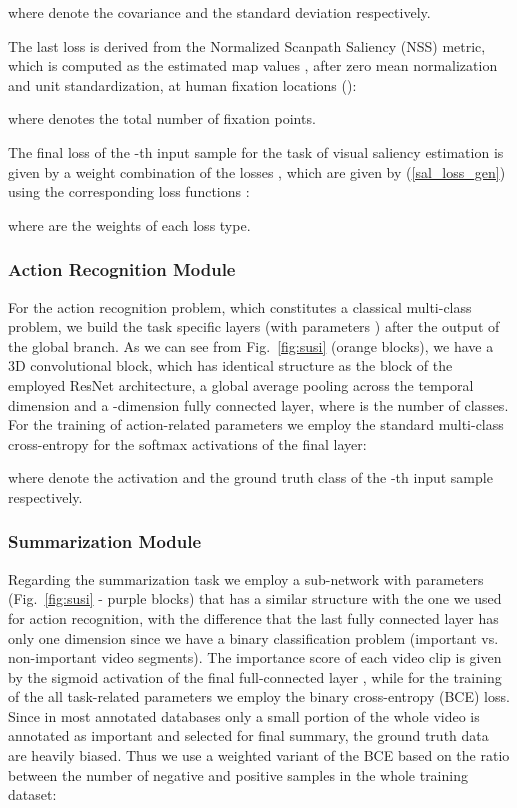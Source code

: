 \documentclass[10pt,twocolumn,letterpaper]{article}
\begin{document}
where  denote the covariance and the standard deviation respectively. 

The last loss is derived from the Normalized Scanpath Saliency (NSS) metric, which is computed
as the estimated map values , after zero mean normalization and unit standardization, at human fixation locations ():

where  denotes the total number of fixation points. 

The final loss of the -th input sample for the task of visual saliency estimation is given by a weight combination of the losses , which are given by (\ref{sal_loss_gen}) using the corresponding loss functions :
  
where  are the weights of each loss type.

\subsubsection{Action Recognition Module}

For the action recognition problem, which constitutes a classical multi-class problem, we build the task specific layers (with parameters ) after the output  of the global branch. As we can see from Fig.~\ref{fig:susi} (orange blocks), we have a 3D convolutional block, which has identical structure as the  block of the employed ResNet architecture, a global average pooling across the temporal dimension and a -dimension fully connected layer, where  is the number of classes. For the training of action-related parameters  we employ the standard multi-class cross-entropy for the softmax activations  of the final layer:

where  denote the activation and the ground truth class of the -th input sample respectively.

\subsubsection{Summarization Module}

Regarding the summarization task we employ a sub-network with parameters  (Fig.~\ref{fig:susi} - purple blocks) that has a similar structure with the one we used for action recognition, with the difference that the last fully connected layer has only one dimension since we have a binary classification problem (important vs. non-important video segments). The importance score of each video clip is given by the sigmoid activation of the final full-connected layer , while for the training of the all task-related parameters  we employ the binary cross-entropy (BCE) loss. Since in most annotated databases only a small portion of the whole video is annotated as important and selected for final summary, the ground truth data are heavily biased. Thus we use a weighted variant of the BCE based on the ratio  between the number of negative and positive samples in the whole training dataset:
\end{document}
